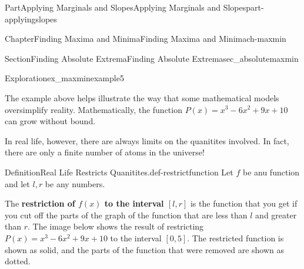 \documentclass{tufte-book}
\newcommand{\terminology}[1]{\textbf{#1}}
\numberwithin{equation}{chapter}
\begin{document}
\begin{partptx}{Part}{Applying Marginals and Slopes}{}{Applying Marginals and Slopes}{}{}{part-applyingslopes}
\begin{chapterptx}{Chapter}{Finding Maxima and Minima}{}{Finding Maxima and Minima}{}{}{ch-maxmin}
\begin{sectionptx}{Section}{Finding Absolute Extrema}{}{Finding Absolute Extrema}{}{}{sec_absolutemaxmin}
\begin{exploration}{Exploration}{}{ex_maxminexample5}
\begin{enumerate}[font=\bfseries,label=(\alph*),ref=\alph*]
\begin{image}{0.25}{0.5}{0.25}{}
{
}%
\end{image}%
%
\end{enumerate}%
\end{exploration}%
The example above helps illustrate the way that some mathematical models oversimplify reality. Mathematically, the function \(P(x) = x^3 - 6x^2 + 9x + 10\) can grow without bound.%
\par
In real life, however, there are always limits on the quanitites involved. In fact, there are only a finite number of atoms in the universe!%
\begin{definition}{Definition}{Real Life Restricts Quanitites.}{def-restrictfunction}%
Let \(f\) be anu function and let \(l,r\) be any numbers.%
\par
The \terminology{restriction of \(f(x)\) to the interval \([l,r]\)} is the function that you get if you cut off the parts of the graph of the function that are less than \(l\) and greater than \(r\).%
The image below shows the result of restricting \(P(x) = x^3 - 6x^2 + 9x + 10\) to the interval \([0,5]\).  The restricted function is shown as solid, and the parts of the function that were removed are shown as dotted.%
\begin{image}{0.25}{0.5}{0.25}{}%
\end{image}
\end{definition}
\end{sectionptx}
\end{chapterptx}
\end{partptx}
\end{document}

